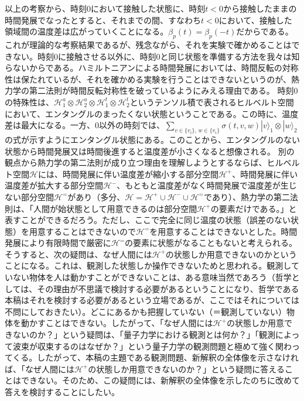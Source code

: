   以上の考察から、時刻$0$において接触した状態に、時刻$t<0$から接触したままの時間発展でなったとすると、それまでの間、すなわち$t<0$において、接触した領域間の温度差は広がっていくことになる。$\beta_p(t) = \beta_p(-t)$だからである。これが理論的な考察結果であるが、残念ながら、それを実験で確かめることはできない。時刻$0$に接触させる以外に、時刻$0$と同じ状態を準備する方法を我々は知らないからである。ハミルトニアンによる時間発展においては、時間反転の対称性は保たれているが、それを確かめる実験を行うことはできないというのが、熱力学の第二法則が時間反転対称性を破っているようにみえる理由である。
  時刻$0$の特殊性は、$\mathcal{H}_1^a \otimes \mathcal{H}_2^a \otimes \mathcal{H}_1^t \otimes \mathcal{H}_2^t$というテンソル積で表されるヒルベルト空間において、エンタングルのまったくない状態ということである。この時に、温度差は最大になる。一方、$0$以外の時刻では、$\sum_{v \in \{v_i\} ,\, w \in \{v_i\}} \sigma(t,v,w)|v\rangle_1 \otimes |w\rangle_2 $の式が示すようにエンタングル状態にある。このことから、エンタングルのない状態から時間発展又は時間後進すると温度差が小さくなると想像される。
  別の観点から熱力学の第二法則が成り立つ理由を理解しようとするならば、ヒルベルト空間$\mathcal{H}$には、時間発展に伴い温度差が縮小する部分空間$\mathcal{H}^+$、時間発展に伴い温度差が拡大する部分空間$\mathcal{H}^-$、もともと温度差がなく時間発展で温度差が生じない部分空間$\mathcal{H}^=$があり（多分、$\mathcal{H}=\mathcal{H}^+ \cup \mathcal{H}^- \cup \mathcal{H}^=$であり）、熱力学の第二法則は、「人間が始状態として用意できるのは部分空間$\mathcal{H}^+$の要素だけである。」と表すことができるだろう。ただし、ここで完全に同じ温度の状態（誤差のない状態）を用意することはできないので$\mathcal{H}^=$を用意することはできないとした。時間発展により有限時間で厳密に$\mathcal{H}^=$の要素に状態がなることもないと考えられる。
  そうすると、次の疑問は、なぜ人間には$\mathcal{H}^+$の状態しか用意できないのかということになる。これは、観測した状態しか操作できないためと思われる。観測していない物体を人は動かすことができないことは、ある意味当然であろう（哲学としては、その理由が不思議で検討する必要があるということになり、哲学である本稿はそれを検討する必要があるという立場であるが、ここではそれについては不問にしておきたい）。どこにあるかも把握していない（＝観測していない）物体を動かすことはできない。したがって、「なぜ人間には$\mathcal{H}^+$の状態しか用意できないのか？」という疑問は、「量子力学における観測とは何か？」「観測によって波束が収束するのはなぜか？」という量子力学の観測問題と極めて強く関わってくる。したがって、本稿の主題である観測問題、新解釈の全体像を示さなければ、「なぜ人間には$\mathcal{H}^+$の状態しか用意できないのか？」という疑問に答えることはできない。そのため、この疑問には、新解釈の全体像を示したのちに改めて答えを検討することにしたい。